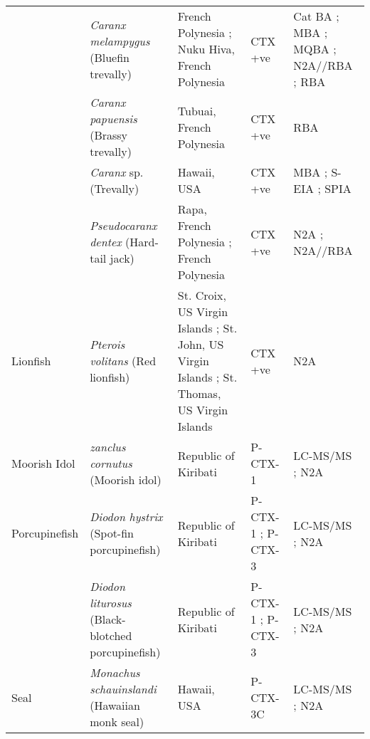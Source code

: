 \documentclass[12pt]{article}
\begin{document}
\begin{longtable}[l]{ | p{2cm} | p{3cm} | p{4.5cm} | p{2cm} | p{3cm} | }
	& \emph{Caranx melampygus} (Bluefin trevally) & French Polynesia \cite{bagnis1987use,chinain2014mail}; Nuku Hiva, French Polynesia \cite{darius2007ciguatera} & CTX +ve \cite{bagnis1987use,darius2007ciguatera,chinain2014mail} & Cat BA \cite{bagnis1987use}; MBA \cite{bagnis1987use}; MQBA \cite{bagnis1987use}; N2A//RBA \cite{chinain2014mail}; RBA \cite{darius2007ciguatera} \\
	& \emph{Caranx papuensis} (Brassy trevally) & Tubuai, French Polynesia \cite{darius2007ciguatera} & CTX +ve \cite{darius2007ciguatera} & RBA \cite{darius2007ciguatera} \\
	& \emph{Caranx} sp. (Trevally) & Hawaii, USA \cite{hokama1993evaluation,hokama1990simplified} & CTX +ve \cite{hokama1990simplified,hokama1993evaluation} & MBA \cite{hokama1993evaluation}; S-EIA \cite{hokama1993evaluation,hokama1990simplified}; SPIA \cite{hokama1990simplified,hokama1993evaluation} \\
	& \emph{Pseudocaranx dentex} (Hard-tail jack) & Rapa, French Polynesia \cite{pawlowiez2013evaluation}; French Polynesia \cite{chinain2014mail} & CTX +ve \cite{chinain2014mail,pawlowiez2013evaluation} & N2A \cite{pawlowiez2013evaluation}; N2A//RBA \cite{chinain2014mail} \\
	\hline
	Lionfish & \emph{Pterois volitans} (Red lionfish) & St. Croix, US Virgin Islands \cite{robertson2013invasive}; St. John, US Virgin Islands \cite{robertson2013invasive}; St. Thomas, US Virgin Islands \cite{robertson2013invasive} & CTX +ve\cite{robertson2013invasive} & N2A \cite{robertson2013invasive} \\
	\hline
	Moorish Idol & \emph{zanclus cornutus} (Moorish idol) & Republic of Kiribati \cite{mak2013pacific} & P-CTX-1 \cite{mak2013pacific} & LC-MS/MS \cite{mak2013pacific}; N2A \cite{mak2013pacific} \\
	\hline
Porcupinefish & \emph{Diodon hystrix} (Spot-fin porcupinefish) & Republic of Kiribati \cite{mak2013pacific} & P-CTX-1 \cite{mak2013pacific}; P-CTX-3 \cite{mak2013pacific} & LC-MS/MS \cite{mak2013pacific}; N2A \cite{mak2013pacific} \\
& \emph{Diodon liturosus} (Black-blotched porcupinefish) & Republic of Kiribati \cite{mak2013pacific} & P-CTX-1 \cite{mak2013pacific}; P-CTX-3 \cite{mak2013pacific} & LC-MS/MS \cite{mak2013pacific}; N2A \cite{mak2013pacific} \\
\hline
	Seal & \emph{Monachus schauinslandi} (Hawaiian monk seal) & Hawaii, USA \cite{bottein2011identification} & P-CTX-3C \cite{bottein2011identification} & LC-MS/MS \cite{bottein2011identification}; N2A \cite{bottein2011identification} \\

\end{longtable}
\end{document}

